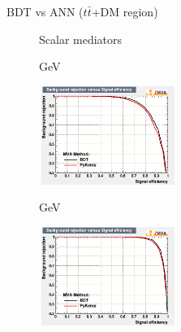 \documentclass[8pt]{beamer}
\begin{document}
\begin{frame}{BDT vs ANN ($t \bar t$+DM region)}
\justifying

\begin{figure}[htbp]
\centering
\begin{block}{ \centering Scalar mediators}\end{block} \vspace{-10pt}
\begin{minipage}[b]{.49\textwidth}
\begin{center}
\begin{block}{  GeV}\end{block}
\includegraphics[width=4.5cm, height=3.2cm]{figs/ROC_scalar100_TTbar.png}
\end{center}
\end{minipage} \hfill
\begin{minipage}[b]{.49\textwidth}
\begin{center}
\begin{block}{  GeV}\end{block}
\includegraphics[width=4.5cm, height=3.2cm]{figs/ROC_scalar500_TTbar.png}
\end{center}
\end{minipage} \hfill


\end{figure}
\end{frame}
\end{document}
